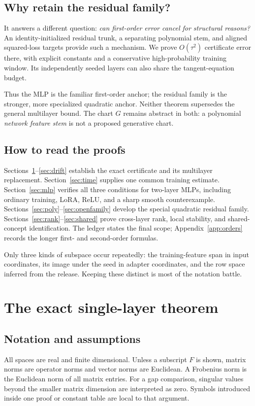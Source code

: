\documentclass[12pt,a4paper]{article}
\theoremstyle{readable}
\theoremstyle{definition}\newtheorem{example}[theorem]{Example}
\begin{document}
\subsection{Why retain the residual family?}
It answers a different question: \emph{can first-order error cancel for structural reasons?} An identity-initialized residual trunk, a separating polynomial stem, and aligned squared-loss targets provide such a mechanism. We prove \(O(\tau^2)\) certificate error there, with explicit constants and a conservative high-probability training window. Its independently seeded layers can also share the tangent-equation budget.

Thus the MLP is the familiar first-order anchor; the residual family is the stronger, more specialized quadratic anchor. Neither theorem supersedes the general multilayer bound. The chart \(G\) remains abstract in both: a polynomial \emph{network feature stem} is not a proposed generative chart.

\subsection{How to read the proofs}
Sections~\ref{sec:single}--\ref{sec:drift} establish the exact certificate and its multilayer replacement. Section~\ref{sec:time} supplies one common training estimate. Section~\ref{sec:mlp} verifies all three conditions for two-layer MLPs, including ordinary training, LoRA, ReLU, and a sharp smooth counterexample. Sections~\ref{sec:poly}--\ref{sec:openfamily} develop the special quadratic residual family. Sections~\ref{sec:rank}--\ref{sec:shared} prove cross-layer rank, local stability, and shared-concept identification. The ledger states the final scope; Appendix~\ref{app:orders} records the longer first- and second-order formulas.

Only three kinds of subspace occur repeatedly: the training-feature span in input coordinates, its image under the seed in adapter coordinates, and the row space inferred from the release. Keeping these distinct is most of the notation battle.

\section{The exact single-layer theorem}
\label{sec:single}

\subsection{Notation and assumptions}
All spaces are real and finite dimensional. Unless a subscript \(F\) is shown, matrix norms are operator norms and vector norms are Euclidean. A Frobenius norm is the Euclidean norm of all matrix entries. For a gap comparison, singular values beyond the smaller matrix dimension are interpreted as zero. Symbols introduced inside one proof or constant table are local to that argument.
\end{document}

